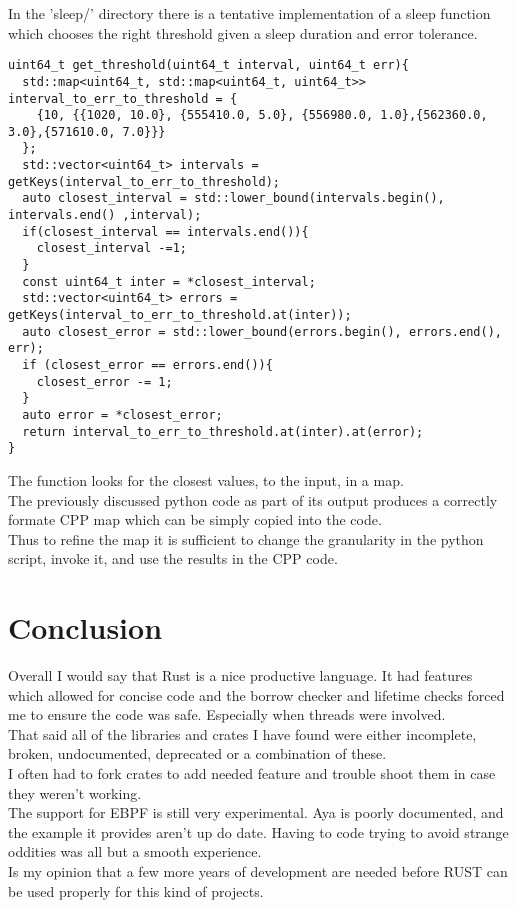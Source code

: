 \documentclass{article}
\begin{document}
In the 'sleep/' directory there is a tentative implementation of a sleep function which chooses the right threshold given a sleep duration and error tolerance.
\begin{verbatim}
uint64_t get_threshold(uint64_t interval, uint64_t err){
  std::map<uint64_t, std::map<uint64_t, uint64_t>> interval_to_err_to_threshold = {
    {10, {{1020, 10.0}, {555410.0, 5.0}, {556980.0, 1.0},{562360.0, 3.0},{571610.0, 7.0}}}
  };
  std::vector<uint64_t> intervals = getKeys(interval_to_err_to_threshold);
  auto closest_interval = std::lower_bound(intervals.begin(), intervals.end() ,interval);
  if(closest_interval == intervals.end()){
    closest_interval -=1;
  }
  const uint64_t inter = *closest_interval;
  std::vector<uint64_t> errors = getKeys(interval_to_err_to_threshold.at(inter));
  auto closest_error = std::lower_bound(errors.begin(), errors.end(), err);
  if (closest_error == errors.end()){
    closest_error -= 1;
  }
  auto error = *closest_error;
  return interval_to_err_to_threshold.at(inter).at(error);
}
\end{verbatim}
The function looks for the closest values, to the input, in a map.\\
The previously discussed python code as part of its output produces a correctly formate CPP map which can be simply copied into the code.\\
Thus to refine the map it is sufficient to change the granularity in the python script, invoke it, and use the results in the CPP code.

\section*{Conclusion}
Overall I would say that Rust is a nice productive language. It had features which allowed for concise code and the borrow checker and lifetime checks forced me to ensure the code was safe. Especially when threads were involved.\\
That said all of the libraries and crates I have found were either incomplete, broken, undocumented, deprecated or a combination of these.\\
I often had to fork crates to add needed feature and trouble shoot them in case they weren't working.\\
The support for EBPF is still very experimental. Aya is poorly documented, and the example it provides aren't up do date. Having to code trying to avoid strange oddities was all but a smooth experience.\\
Is my opinion that a few more years of development are needed before RUST can be used properly for this kind of projects.
\end{document}
